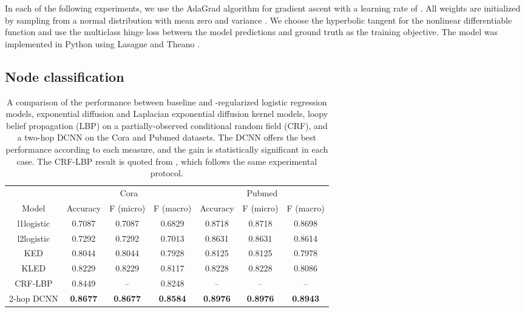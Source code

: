 \documentclass{article}
\begin{document}
In each of the following experiments, we use the AdaGrad algorithm \cite{duchi2011adaptive} for gradient ascent with a learning rate of .  All weights are initialized by sampling from a normal distribution with mean zero and variance .  We choose the hyperbolic tangent for the nonlinear differentiable function  and use the multiclass hinge loss between the model predictions and ground truth as the training objective.  The model was implemented in Python using Lasagne and Theano \cite{bergstra+al:2010-scipy}.

\subsection{Node classification}

\begin{table}[b]
    \centering
    \begin{tabular}{c|c|c|c||c|c|c|}
         \cline{2-7}
         & \multicolumn{3}{c||}{Cora} & \multicolumn{3}{c|}{Pubmed} \\
         \cline{2-7}
         Model & Accuracy & F (micro) & F (macro) & Accuracy & F (micro) & F (macro) \\
         \hline
         l1logistic & 0.7087 & 0.7087 & 0.6829 & 0.8718 & 0.8718 & 0.8698 \\
         l2logistic & 0.7292 & 0.7292 & 0.7013 & 0.8631 & 0.8631 & 0.8614 \\
         KED & 0.8044 & 0.8044 & 0.7928 & 0.8125 & 0.8125 & 0.7978 \\
         KLED & 0.8229 & 0.8229 & 0.8117 & 0.8228 & 0.8228 & 0.8086 \\
         CRF-LBP & 0.8449 & -- & 0.8248 & -- & -- & -- \\
         2-hop DCNN & \textbf{0.8677} & \textbf{0.8677} & \textbf{0.8584} &  \textbf{0.8976} & \textbf{0.8976} & \textbf{0.8943} \\
         \hline 
    \end{tabular}
    
    \vspace{10pt}
    
    \caption{A comparison of the performance between baseline  and -regularized logistic regression models, exponential diffusion and Laplacian exponential diffusion kernel models, loopy belief propagation (LBP) on a partially-observed conditional random field (CRF), and a two-hop DCNN on the Cora and Pubmed datasets.  The DCNN offers the best performance according to each measure, and the gain is statistically significant in each case.  The CRF-LBP result is quoted from \cite{Sen:2007wh}, which follows the same experimental protocol.}
    \label{tab:cora}
\end{table}
\end{document}
